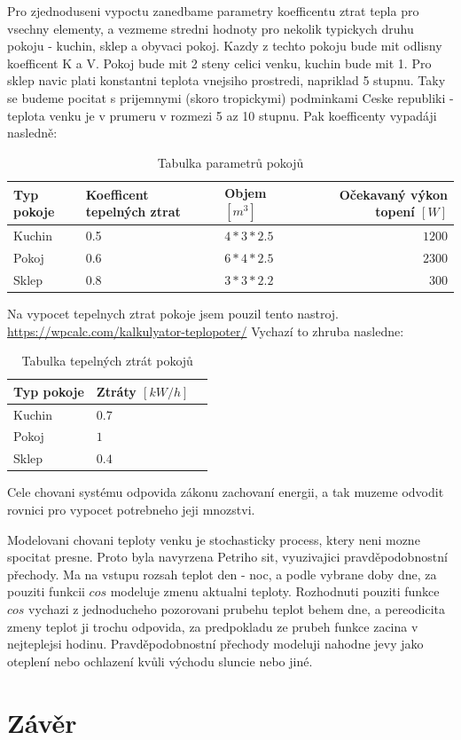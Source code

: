 Pro zjednoduseni vypoctu zanedbame parametry koefficentu ztrat tepla pro vsechny elementy, a vezmeme stredni hodnoty pro nekolik typickych druhu pokoju - kuchin, sklep a obyvaci pokoj. Kazdy z techto pokoju bude mit odlisny koefficent K a V. Pokoj bude mit 2 steny celici venku, kuchin bude mit 1. Pro sklep navic plati konstantni teplota vnejsiho prostredi, napriklad 5 stupnu. Taky se budeme pocitat s prijemnymi (skoro tropickymi) podminkami Ceske republiki - teplota venku je v prumeru v rozmezi 5 az 10 stupnu. \cite{cesko}
Pak koefficenty vypadáji nasledně:

\begin{table}[H]
	\vskip6pt
	\caption{Tabulka parametrů pokojů}
    \vskip6pt
	\centering
	\begin{tabular}{lllr}
		\toprule
		Typ pokoje & Koefficent tepelných ztrat & Objem $[m^3]$ & Očekavaný výkon topení $[W]$ \\
    \midrule
    Kuchin & 0.5 & $4*3*2.5$ & $1200$ \\
    Pokoj & 0.6 & $6*4*2.5$ & $2300$ \\
    Sklep & 0.8 & $3*3*2.2$ & $300$ \\
		\bottomrule
	\end{tabular}
	\label{tab:Parametry}
\end{table}

Na vypocet tepelnych ztrat pokoje jsem pouzil tento nastroj. \url{https://wpcalc.com/kalkulyator-teplopoter/}
Vychazí to zhruba nasledne:

\begin{table}[H]
	\vskip6pt
	\caption{Tabulka tepelných ztrát pokojů} 
    \vskip6pt
	\centering
	\begin{tabular}{llr}
		\toprule
		Typ pokoje & Ztráty $[kW/h]$ \\
		\midrule
		Kuchin & $0.7$ \\
    Pokoj & $1$ \\
    Sklep & $0.4$ \\
		\bottomrule
	\end{tabular}
	\label{tab:TepelneZtraty}
\end{table}

Cele chovani systému odpovida zákonu zachovaní energii, a tak muzeme odvodit rovnici pro vypocet potrebneho jeji mnozstvi.


Modelovani chovani teploty venku je stochasticky process, ktery neni mozne spocitat presne. Proto byla navyrzena Petriho sit, vyuzivajici pravděpodobnostní přechody. Ma na vstupu rozsah teplot den - noc, a podle vybrane doby dne, za pouziti funkcii $cos$ modeluje zmenu aktualni teploty. Rozhodnuti pouziti funkce $cos$ vychazi z jednoducheho pozorovani prubehu teplot behem dne, a pereodicita zmeny teplot ji trochu odpovida, za predpokladu ze prubeh funkce zacina v nejteplejsi hodinu. %
Pravděpodobnostní přechody modeluji nahodne jevy jako oteplení nebo ochlazení kvůli východu sluncie nebo jiné.


\chapter{Závěr}
\label{zaver}
